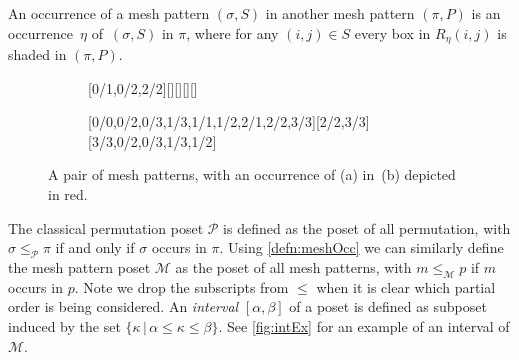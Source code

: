 \documentclass[11pt,a4paper,oneside]{article}
\begin{document}
\begin{defn}[\cite{TU17}]\label{defn:meshOcc}
An occurrence of a mesh pattern $(\sigma,S)$ in another mesh
pattern $(\pi,P)$ is an occurrence~$\eta$ of~$(\sigma,S)$ in $\pi$, where for any $(i,j)\in S$
every box in $R_\eta(i,j)$ is shaded in $(\pi,P)$.
\end{defn}

\begin{figure}\centering
\begin{subfigure}[b]{0.3\textwidth}
\centering{}[0/1,0/2,2/2][][][][]
\caption{}\label{subfiga}\end{subfigure}
\begin{subfigure}[b]{0.3\textwidth}\centering
{}[0/0,0/2,0/3,1/3,1/1,1/2,2/1,2/2,3/3][2/2,3/3][3/3,0/2,0/3,1/3,1/2]
\caption{}\label{subfigc}\end{subfigure}
\caption{A pair of mesh patterns, with an occurrence of (a) in~(b) depicted in red.
 }\label{fig:occEx}
\end{figure}

The classical permutation poset $\mathcal{P}$ is defined as the poset of all permutation,
with $\sigma\le_\mathcal{P}\pi$ if and only if $\sigma$ occurs in $\pi$. Using \cref{defn:meshOcc}
we can similarly define the mesh pattern poset $\mathcal{M}$ as the poset of all mesh patterns,
with $m\le_\mathcal{M} p$ if $m$ occurs in $p$. Note we drop the subscripts from $\le$ when it is clear
which partial order is being considered. An \emph{interval} $[\alpha,\beta]$ of a poset is defined as subposet induced by the set
$\{\kappa\,|\,\alpha\le\kappa\le\beta\}$. See \cref{fig:intEx} for an example of an interval of $\mathcal{M}$.
\end{document}
